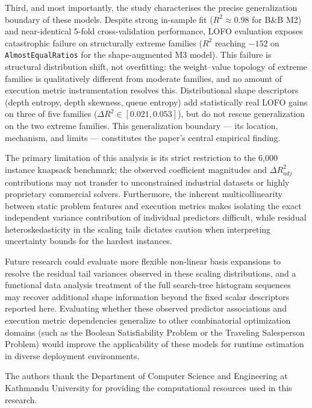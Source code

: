 \documentclass[sigconf]{acmart}
\begin{document}
Third, and most importantly, the study characterises the precise generalization boundary of these models. Despite strong in-sample fit ($R^2 \approx 0.98$ for B\&B M2) and near-identical 5-fold cross-validation performance, LOFO evaluation exposes catastrophic failure on structurally extreme families ($R^2$ reaching $-152$ on \texttt{AlmostEqualRatios} for the shape-augmented M3 model). This failure is structural distribution shift, not overfitting: the weight--value topology of extreme families is qualitatively different from moderate families, and no amount of execution metric instrumentation resolves this. Distributional shape descriptors (depth entropy, depth skewness, queue entropy) add statistically real LOFO gains on three of five families ($\Delta R^2 \in [0.021, 0.053]$), but do not rescue generalization on the two extreme families. This generalization boundary --- its location, mechanism, and limits --- constitutes the paper's central empirical finding.

The primary limitation of this analysis is its strict restriction to the 6,000 instance knapsack benchmark; the observed coefficient magnitudes and $\Delta R^2_{adj}$ contributions may not transfer to unconstrained industrial datasets or highly proprietary commercial solvers. Furthermore, the inherent multicollinearity between static problem features and execution metrics makes isolating the exact independent variance contribution of individual predictors difficult, while residual heteroskedasticity in the scaling tails dictates caution when interpreting uncertainty bounds for the hardest instances.

Future research could evaluate more flexible non-linear basis expansions to resolve the residual tail variances observed in these scaling distributions, and a functional data analysis treatment of the full search-tree histogram sequences may recover additional shape information beyond the fixed scalar descriptors reported here. Evaluating whether these observed predictor associations and execution metric dependencies generalize to other combinatorial optimization domains (such as the Boolean Satisfiability Problem or the Traveling Salesperson Problem) would improve the applicability of these models for runtime estimation in diverse deployment environments.

\begin{acks}
The authors thank the Department of Computer Science and Engineering at Kathmandu University for providing the computational resources used in this research.
\end{acks}
\end{document}

